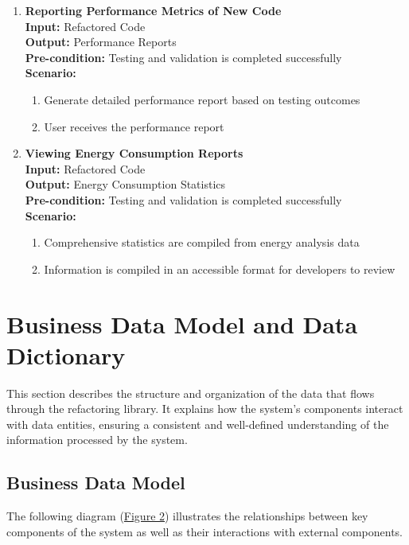 \documentclass[12pt]{article}
\begin{document}
\begin{enumerate}[label={\bf BUC \arabic*:}, wide=0pt, font=\itshape]
  \item {\bf Reporting Performance Metrics of New Code} \\[2mm]
    \textbf{Input:} Refactored Code \\
    \textbf{Output:} Performance Reports\\
    \textbf{Pre-condition:} Testing and validation is completed successfully \\[2mm]
    \textbf{Scenario: }
    \begin{enumerate}[label=\arabic*.]
        \item Generate detailed performance report based on testing outcomes
        \item User receives the performance report
    \end{enumerate}

  \item {\bf Viewing Energy Consumption Reports} \\[2mm]
    \textbf{Input:} Refactored Code \\
    \textbf{Output:} Energy Consumption Statistics \\
    \textbf{Pre-condition:} Testing and validation is completed successfully \\[2mm]
    \textbf{Scenario: }
    \begin{enumerate}[label=\arabic*.]
        \item Comprehensive statistics are compiled from energy analysis data
        \item Information is compiled in an accessible format for developers to review
    \end{enumerate}
\end{enumerate}

\section{Business Data Model and Data Dictionary}

This section describes the structure and organization of the data that flows through the refactoring library. It explains how the system's components interact with data entities, ensuring a consistent and well-defined understanding of the information processed by the system.

\subsection{Business Data Model}
The following diagram (\hyperref[img:bdata-model]{Figure 2}) illustrates the relationships between key components of the system as well as their interactions with external components.
\end{document}
